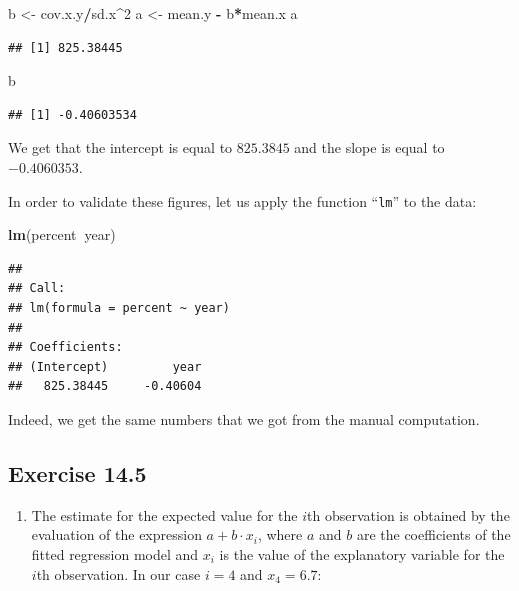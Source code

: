 \documentclass[]{krantz}
\makeatletter
\newenvironment{Shaded}{\begin{snugshade}}{\end{snugshade}}
\newcommand{\KeywordTok}[1]{\textcolor[rgb]{0.13,0.29,0.53}{\textbf{#1}}}
\newcommand{\DecValTok}[1]{\textcolor[rgb]{0.00,0.00,0.81}{#1}}
\newcommand{\StringTok}[1]{\textcolor[rgb]{0.31,0.60,0.02}{#1}}
\newcommand{\OperatorTok}[1]{\textcolor[rgb]{0.81,0.36,0.00}{\textbf{#1}}}
\newcommand{\NormalTok}[1]{#1}
\providecommand{\tightlist}{%
  \setlength{\itemsep}{0pt}\setlength{\parskip}{0pt}}
\newenvironment{kframe}{%
\medskip{}
\setlength{\fboxsep}{.8em}
 \def\at@end@of@kframe{}%
 \ifinner\ifhmode%
  \def\at@end@of@kframe{\end{minipage}}%
  \begin{minipage}{\columnwidth}%
 \fi\fi%
 \def\FrameCommand##1{\hskip\@totalleftmargin \hskip-\fboxsep
 \colorbox{shadecolor}{##1}\hskip-\fboxsep
     \hskip-\linewidth \hskip-\@totalleftmargin \hskip\columnwidth}%
 \MakeFramed {\advance\hsize-\width
   \@totalleftmargin\z@ \linewidth\hsize
   \@setminipage}}%
 {\par\unskip\endMakeFramed%
 \at@end@of@kframe}
\renewenvironment{Shaded}{\begin{kframe}}{\end{kframe}}
\theoremstyle{definition}
\theoremstyle{definition}
\theoremstyle{definition}
\theoremstyle{remark}
\makeatother
\begin{document}
\begin{enumerate}
\begin{Shaded}
\begin{Highlighting}[]
\NormalTok{b <-}\StringTok{ }\NormalTok{cov.x.y}\OperatorTok{/}\NormalTok{sd.x}\OperatorTok{^}\DecValTok{2}
\NormalTok{a <-}\StringTok{ }\NormalTok{mean.y }\OperatorTok{-}\StringTok{ }\NormalTok{b}\OperatorTok{*}\NormalTok{mean.x}
\NormalTok{a}
\end{Highlighting}
\end{Shaded}

\begin{verbatim}
## [1] 825.38445
\end{verbatim}

\begin{Shaded}
\begin{Highlighting}[]
\NormalTok{b}
\end{Highlighting}
\end{Shaded}

\begin{verbatim}
## [1] -0.40603534
\end{verbatim}

  We get that the intercept is equal to \(825.3845\) and the slope is
  equal to \(-0.4060353\).

  In order to validate these figures, let us apply the function
  ``\texttt{lm}'' to the data:

\begin{Shaded}
\begin{Highlighting}[]
\KeywordTok{lm}\NormalTok{(percent}\OperatorTok{~}\NormalTok{year)}
\end{Highlighting}
\end{Shaded}

\begin{verbatim}
## 
## Call:
## lm(formula = percent ~ year)
## 
## Coefficients:
## (Intercept)         year  
##   825.38445     -0.40604
\end{verbatim}

  Indeed, we get the same numbers that we got from the manual
  computation.
\end{enumerate}

\subsection*{Exercise 14.5}\label{exercise-14.5}


\begin{enumerate}
\def\labelenumi{\arabic{enumi}.}
\tightlist
\item
  The estimate for the expected value for the \(i\)th observation is
  obtained by the evaluation of the expression \(a + b\cdot x_i\), where
  \(a\) and \(b\) are the coefficients of the fitted regression model
  and \(x_i\) is the value of the explanatory variable for the \(i\)th
  observation. In our case \(i=4\) and \(x_4 = 6.7\):
\end{enumerate}
\end{document}
